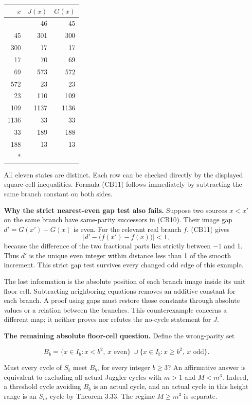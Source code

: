 \documentclass[12pt]{article}
\begin{document}
\begingroup\small

\begin{longtable}[]{@{}rrr@{}}
\toprule\noalign{}
\(x\) & \(J(x)\) & \(G(x)\) \\
\midrule\noalign{}
\endhead
\bottomrule\noalign{}
\endfoot
\bottomrule\noalign{}
\endlastfoot
13 & 46 & 45 \\
45 & 301 & 300 \\
300 & 17 & 17 \\
17 & 70 & 69 \\
69 & 573 & 572 \\
572 & 23 & 23 \\
23 & 110 & 109 \\
109 & 1137 & 1136 \\
1136 & 33 & 33 \\
33 & 189 & 188 \\
188 & 13 & 13 \\*
\end{longtable}

\endgroup

All eleven states are distinct. Each row can be checked directly by the
displayed square-cell inequalities. Formula (CB11) follows immediately
by subtracting the same branch constant on both sides.

\textbf{Why the strict nearest-even gap test also fails.} Suppose two
sources \(x<x'\) on the same branch have same-parity successors in
(CB10). Their image gap \(d'=G(x')-G(x)\) is even. For the relevant real
branch \(f\), (CB11) gives \[
\left|d'-\bigl(f(x')-f(x)\bigr)\right|<1,
\] because the difference of the two fractional parts lies strictly
between \(-1\) and 1. Thus \(d'\) is the unique even integer within
distance less than 1 of the smooth increment. This strict gap test
survives every changed odd edge of this example.

The lost information is the absolute position of each branch image
inside its unit floor cell. Subtracting neighboring equations removes an
additive constant for each branch. A proof using gaps must restore those
constants through absolute values or a relation between the branches.
This counterexample concerns a different map; it neither proves nor
refutes the no-cycle statement for \(J\).

\textbf{The remaining absolute floor-cell question.} Define the
wrong-parity set

\[
B_b=\{x\in I_b:x<b^2,\ x\text{ even}\}\ \cup
\{x\in I_b:x\ge b^2,\ x\text{ odd}\}.
\]

Must every cycle of \(S_b\) meet \(B_b\), for every integer \(b\ge3\)?
An affirmative answer is equivalent to excluding all actual Juggler
cycles with \(m>1\) and \(M<m^3\). Indeed, a threshold cycle avoiding
\(B_b\) is an actual cycle, and an actual cycle in this height range is
an \(S_m\) cycle by Theorem 3.33. The regime \(M\ge m^3\) is separate.
\end{document}
